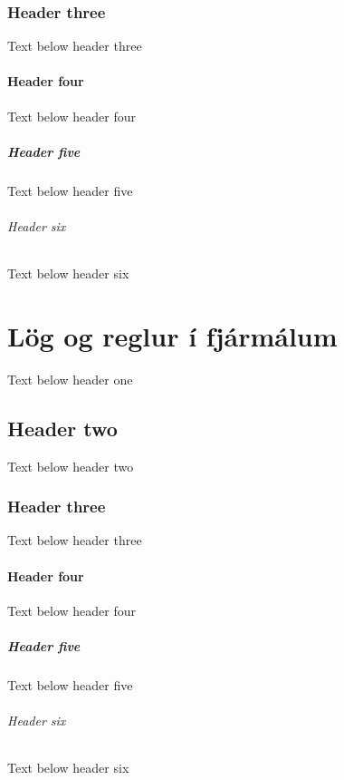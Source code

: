 \documentclass[a4paper,10pt,icelandic]{sphinxmanual}
\begin{document}
\subsection{Header three}
\label{\detokenize{taekni-og-fjarmal/index:header-three}}
\sphinxAtStartPar
Text below header three


\subsubsection{Header four}
\label{\detokenize{taekni-og-fjarmal/index:header-four}}
\sphinxAtStartPar
Text below header four


\paragraph{Header five}
\label{\detokenize{taekni-og-fjarmal/index:header-five}}
\sphinxAtStartPar
Text below header five


\subparagraph{Header six}
\label{\detokenize{taekni-og-fjarmal/index:header-six}}
\sphinxAtStartPar
Text below header six

\sphinxstepscope


\chapter{Lög og reglur í fjármálum}
\label{\detokenize{log-og-reglur-i-fjarmalum/index:log-og-reglur-i-fjarmalum}}\label{\detokenize{log-og-reglur-i-fjarmalum/index::doc}}
\sphinxAtStartPar
Text below header one


\section{Header two}
\label{\detokenize{log-og-reglur-i-fjarmalum/index:header-two}}
\sphinxAtStartPar
Text below header two


\subsection{Header three}
\label{\detokenize{log-og-reglur-i-fjarmalum/index:header-three}}
\sphinxAtStartPar
Text below header three


\subsubsection{Header four}
\label{\detokenize{log-og-reglur-i-fjarmalum/index:header-four}}
\sphinxAtStartPar
Text below header four


\paragraph{Header five}
\label{\detokenize{log-og-reglur-i-fjarmalum/index:header-five}}
\sphinxAtStartPar
Text below header five


\subparagraph{Header six}
\label{\detokenize{log-og-reglur-i-fjarmalum/index:header-six}}
\sphinxAtStartPar
Text below header six



\renewcommand{\indexname}{Yfirlit}
\printindex
\end{document}
